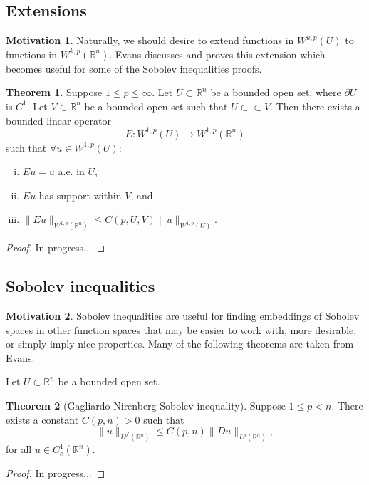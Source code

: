 \documentclass[11pt]{article}
\theoremstyle{definition}
\newtheorem*{theorem}{Theorem}
\newtheorem*{motivation}{Motivation}
\begin{document}
\newpage

\subsection{Extensions}
\begin{motivation}
Naturally, we should desire to extend functions in $W^{k,p}(U)$ to functions in $W^{k,p}(\mathbb{R}^n)$.
Evans discusses and proves this extension which becomes useful for some of the Sobolev inequalities proofs.
\end{motivation}

\begin{theorem}
	Suppose $1 \leq p \leq \infty$.
Let $U \subset \mathbb{R}^n$ be a bounded open set, where $\partial U$ is $C^1$.
Let $V \subset \mathbb{R}^n$ be a bounded open set such that $U \subset\subset V$.
Then there exists a bounded linear operator
	\[E: W^{1,p}(U) \rightarrow W^{1,p}(\mathbb{R}^n)\]
such that $\forall u \in W^{1,p}(U)$:
	\begin{enumerate}[(i)]
		\item $Eu = u$ a.e. in $U$,
		\item $Eu$ has support within $V$, and
		\item $\|Eu\|_{W^{1,p}(\mathbb{R}^n)} \leq C(p,U,V)\|u\|_{W^{1,p}(U)}.$
	\end{enumerate}
\end{theorem}
\begin{proof}
In progress...
\end{proof}

\newpage

\subsection{Sobolev inequalities}
\begin{motivation}
Sobolev inequalities are useful for finding embeddings of Sobolev spaces in other function spaces that may be easier to work with, more desirable,
or simply imply nice properties. Many of the following theorems are taken from Evans.
\end{motivation}
Let $U \subset \mathbb{R}^n$ be a bounded open set.
\begin{theorem}[Gagliardo-Nirenberg-Sobolev inequality]
Suppose $1\leq p < n$. There exists a constant $C(p,n) > 0$ such that
	\[\|u\|_{L^{p^*}(\mathbb{R}^n)} \leq C(p,n)\|Du\|_{L^{p}(\mathbb{R}^n)},\]
for all $u \in C_{c}^{1}(\mathbb{R}^n)$.
\end{theorem}
\begin{proof}
In progress...
\end{proof}
\end{document}
